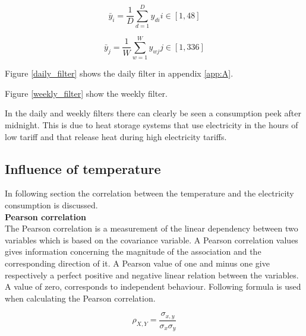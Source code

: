 \begin{equation}\label{eq:daily_filter}
	\bar{y}_i = \frac{1}{D} \sum_{d=1}^D y_{di} i \in [1,48]
\end{equation} 

\begin{equation}\label{eq:weekly_filter}
	\bar{y}_j = \frac{1}{W} \sum_{w=1}^W y_{wj}  j \in [1,336]
\end{equation} 


Figure \ref{daily_filter} shows the daily filter in appendix \ref{app:A}. 

Figure \ref{weekly_filter} show the weekly filter.





In the daily and weekly filters there can clearly be seen a consumption peek after midnight. This is due to heat storage systems that use electricity in the hours of low tariff and that release heat during high electricity tariffs. 


\subsection{Influence of temperature}
In following section the correlation between the temperature and the electricity consumption is discussed.\\


\textbf{Pearson correlation}\\
The Pearson correlation is a measurement of the linear dependency between two variables which is based on the covariance variable. A Pearson correlation values gives information concerning the magnitude of the association and the corresponding direction of it. A Pearson value of one and minus one give respectively a perfect positive and negative linear relation between the variables. A value of zero, corresponds to independent behaviour. Following formula is used when calculating the Pearson correlation. 

\begin{equation}\label{eq:pearson}
	\rho_{X,Y} = \frac{\sigma_{x,y}}{\sigma_x\sigma_y}
\end{equation}

